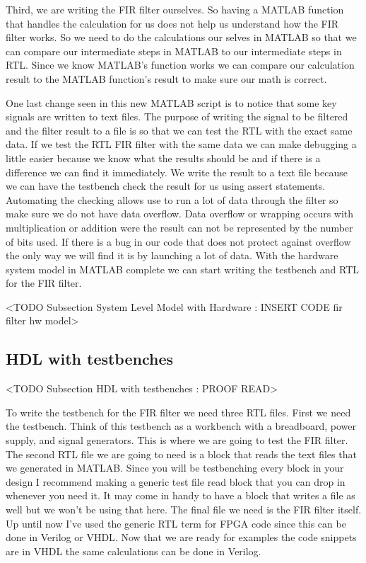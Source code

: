 Third, we are writing the \ac{FIR} filter ourselves. So having a MATLAB function that handles the calculation for us does not help us understand how the \ac{FIR} filter works. So we need to do the calculations our selves in MATLAB so that we can compare our intermediate steps in MATLAB to our intermediate steps in \ac{RTL}. Since we know MATLAB's function works we can compare our calculation result to the MATLAB function's result to make sure our math is correct.



One last change seen in this new MATLAB script is to notice that some key signals are written to text files. The purpose of writing the signal to be filtered and the filter result to a file is so that we can test the \ac{RTL} with the exact same data. If we test the \ac{RTL} \ac{FIR} filter with the same data we can make debugging a little easier because we know what the results should be and if there is a difference we can find it immediately. We write the result to a text file because we can have the testbench check the result for us using assert statements. Automating the checking allows use to run a lot of data through the filter so make sure we do not have data overflow. Data overflow or wrapping occurs with multiplication or addition were the result can not be represented by the number of bits used. If there is a bug in our code that does not protect against overflow the only way we will find it is by launching a lot of data.  With the hardware system model in MATLAB complete we can start writing the testbench and \ac{RTL} for the \ac{FIR} filter.

	<TODO Subsection System Level Model with Hardware : INSERT CODE fir filter hw model>
	
\subsection{HDL with testbenches}
	<TODO Subsection HDL with testbenches : PROOF READ>

To write the testbench for the \ac{FIR} filter we need three \ac{RTL} files. First we need the testbench. Think of this testbench as a workbench with a breadboard, power supply, and signal generators. This is where we are going to test the \ac{FIR} filter. The second \ac{RTL} file we are going to need is a block that reads the text files that we generated in MATLAB. Since you will be testbenching every block in your design I recommend making a generic test file read block that you can drop in whenever you need it. It may come in handy to have a block that writes a file as well but we won't be using that here. The final file we need is the \ac{FIR} filter itself. Up until now I've used the generic \ac{RTL} term for \ac{FPGA} code since this can be done in Verilog or \ac{VHDL}. Now that we are ready for examples the code snippets are in \ac{VHDL} the same calculations can be done in Verilog.

